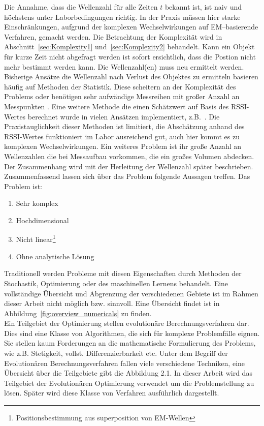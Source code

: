 Die Annahme, dass die Wellenzahl für alle Zeiten $t$ bekannt ist, ist naiv und höchstens unter Laborbedingungen richtig. In der Praxis müssen hier starke Einschränkungen, aufgrund der komplexen Wechselwirkungen auf EM--basierende Verfahren, gemacht werden. Die Betrachtung der Komplexität wird in Abschnitt~\ref{sec:Komplexity1} und~\ref{sec:Komplexity2} behandelt. Kann ein Objekt für kurze Zeit nicht abgefragt werden ist sofort ersichtlich, dass die Postion nicht mehr bestimmt werden kann. Die Wellenzahl(en) muss neu ermittelt werden.\\ 
%

Bisherige Ansätze die Wellenzahl nach Verlust des Objektes zu ermitteln basieren häufig auf Methoden der Statistik. Diese scheitern an der Komplexität des Problems oder benötigen sehr aufwändige Messreihen mit großer Anzahl an Messpunkten \cite{amedo1}. Eine weitere Methode die einen Schätzwert auf Basis des RSSI-Wertes berechnet wurde in vielen Ansätzen implementiert, z.B.~\cite{KALMANandSMOOTHING}. Die Praxistauglichkeit dieser Methoden ist limitiert, die Abschätzung anhand des RSSI-Wertes funktioniert im Labor ausreichend gut, auch hier kommt es zu komplexen Wechselwirkungen. Ein weiteres Problem ist ihr große Anzahl an Wellenzahlen die bei Messaufbau vorkommen, die ein großes Volumen abdecken. Der Zusammenhang wird mit der Herleitung der Wellenzahl später beschrieben.\\
%

Zusammenfassend lassen sich über das Problem folgende Aussagen treffen. Das Problem ist: 
%
\begin{enumerate}[itemsep=0mm]
	\item Sehr komplex
	\item Hochdimensional
	\item Nicht linear\footnote{Positionsbestimmung aus superposition von EM-Wellen}
	\item Ohne analytische Lösung
\end{enumerate}
%

Traditionell werden Probleme mit diesen Eigenschaften durch Methoden der Stochastik, Optimierung oder des maschinellen Lernens behandelt. Eine vollständige Übersicht und Abgrenzung der verschiedenen Gebiete ist im Rahmen dieser Arbeit nicht möglich bzw. sinnvoll. Eine Übersicht findet ist in Abbildung~\ref{fig:overview_numericals} zu finden.\\
%

Ein Teilgebiet der Optimierung stellen evolutionäre Berechnungsverfahren dar. Dies sind eine Klasse von Algorithmen, die sich für komplexe Problemfälle eignen. Sie stellen kaum Forderungen an die mathematische Formulierung des Problems, wie z.B. Stetigkeit, vollst. Differenzierbarkeit etc. Unter dem Begriff der Evolutionären Berechnungsverfahren fallen viele verschiedene Techniken, eine Übersicht über die Teilgebiete gibt die Abbildung 2.1. In dieser Arbeit wird das Teilgebiet der Evolutionären Optimierung verwendet um die Problemstellung zu lösen. Später wird diese Klasse von Verfahren ausführlich dargestellt.\\
%

